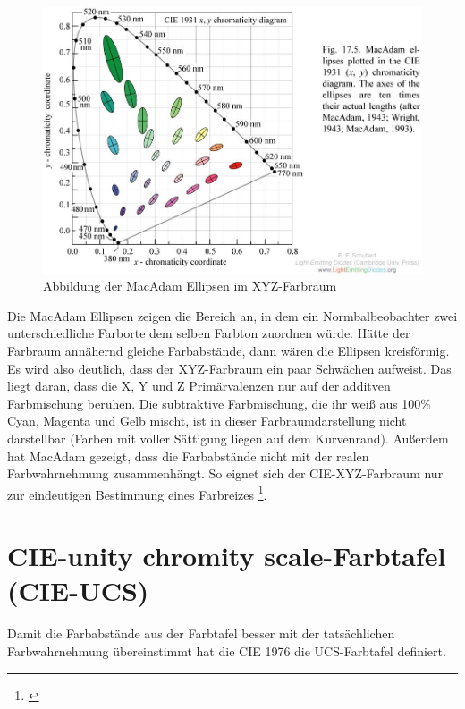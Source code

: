 \begin{figure}[H]     %
\centering
\includegraphics[width=1.0\textwidth]{bilder/ellipsen} 
\caption {Abbildung der MacAdam Ellipsen im XYZ-Farbraum\protect\footnotemark}\label{b_ellipsen}
\end{figure}

Die MacAdam Ellipsen zeigen die Bereich an, in dem ein Normbalbeobachter zwei unterschiedliche Farborte dem selben Farbton zuordnen würde. Hätte der Farbraum annähernd gleiche Farbabstände, dann wären die Ellipsen kreisförmig.\\
Es wird also deutlich, dass der XYZ-Farbraum ein paar Schwächen aufweist. Das liegt daran, dass die X, Y und Z Primärvalenzen nur auf der additven Farbmischung beruhen. Die subtraktive Farbmischung, die ihr weiß aus 100\% Cyan, Magenta und Gelb mischt, ist in dieser Farbraumdarstellung nicht darstellbar (Farben  mit voller Sättigung liegen auf dem Kurvenrand). Außerdem hat MacAdam gezeigt, dass die Farbabstände nicht mit der realen Farbwahrnehmung zusammenhängt. So eignet sich der CIE-XYZ-Farbraum nur zur eindeutigen Bestimmung eines Farbreizes \footnote{\cite[79-80]{greule}}.


\section{CIE-unity chromity scale-Farbtafel (CIE-UCS)} \label{sec_ucs}
Damit die Farbabstände aus der Farbtafel besser mit der tatsächlichen Farbwahrnehmung übereinstimmt hat die CIE 1976 die UCS-Farbtafel definiert.

